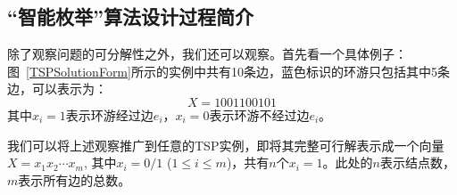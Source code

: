 \subsection{“智能枚举”算法设计过程简介}
  除了观察问题的可分解性之外，我们还可以观察。首先看一个具体例子：图~\ref{TSPSolutionForm}所示的实例中共有10条边，蓝色标识的环游只包括其中5条边，可以表示为：
\[
	X=1001100101  
\]
其中$x_{i} = 1$表示环游经过边$e_{i}$，$x_{i} = 0$表示环游不经过边$e_{i}$。

   我们可以将上述观察推广到任意的TSP实例，即将其完整可行解表示成一个向量$X=x_{1}x_{2}\cdots x_m$, 其中$x_{i}=0/1$ ($1\leq i \leq m$)，共有$n$个$x_{i}=1$。此处的$n$表示结点数，$m$表示所有边的总数。
